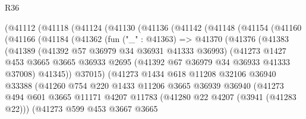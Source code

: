 \begin{lexlean}{R36}
\begin{coremodule}
          (@41112
            (@41118
              (@41124
                (@41130
                  (@41136
                    (@41142
                      (@41148
                        (@41154
                          (@41160
                            (@41166
                              (@41184
                                (@41362
                                  (fun ("_" : @41363) =>
                                  @41370
                                    (@41376
                                      (@41383
                                        (@41389
                                          (@41392 @57 @36979 @34 @36931 @41333 @36993)
                                          (@41273
                                            @1427
                                            @453
                                            @3665
                                            @3665
                                            @36933
                                            @2695
                                            (@41392 @67 @36979 @34 @36933 @41333 @37008)
                                            @41345))
                                        @37015)
                                      (@41273
                                        @1434
                                        @618
                                        @11208
                                        @32106
                                        @36940
                                        @33388
                                        (@41260
                                          @754
                                          @220
                                          @1433
                                          @11206
                                          @3665
                                          @36939
                                          @36940
                                          (@41273
                                            @494
                                            @601
                                            @3665
                                            @11171
                                            @4207
                                            @11783
                                            (@41280 @22 @4207 (@3941 (@41283 @22)))
                                            (@41273
                                              @599
                                              @453
                                              @3667
                                              @3665

\end{coremodule}
\end{lexlean}
